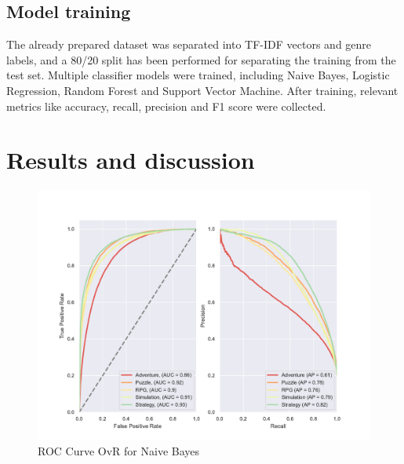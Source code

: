 \documentclass[11pt, a4paper]{article}
\begin{document}
\subsection{Model training}\label{subsec:model-training}
The already prepared dataset was separated into TF-IDF vectors and genre labels, and a 80/20 split has been performed
for separating the training from the test set.
Multiple classifier models were trained, including Naive Bayes, Logistic Regression, Random Forest and Support Vector
Machine.
After training, relevant metrics like accuracy, recall, precision and F1 score were collected.




\section{Results and discussion}\label{sec:results-and-discussion}







\begin{figure}
    \centering
    \includegraphics[width=\textwidth]{data/results/plots/naive_bayes_roc}
    \caption{ROC Curve OvR for Naive Bayes}
    \label{fig:nb_roc_fig}
\end{figure}
\end{document}

